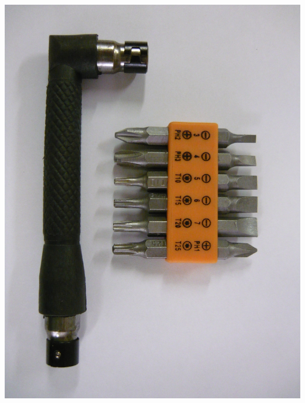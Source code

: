 {\begin{multicols}{2}
\noindent\includegraphics[width=\columnwidth]{00/fig/P1020967.jpg}
\end{multicols}

}{}
